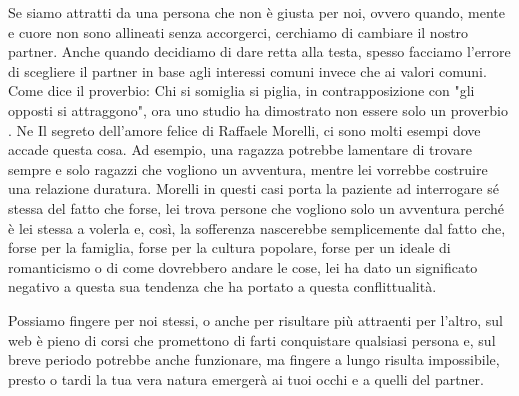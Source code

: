 \documentclass[12pt]{book} %
\begin{document}
Se siamo attratti da una persona che non è giusta per noi, ovvero quando, mente e cuore non sono allineati senza accorgerci, cerchiamo di cambiare il nostro partner. Anche quando decidiamo di dare retta alla testa, spesso facciamo
l'errore di scegliere il partner in base agli interessi comuni invece che ai valori comuni. 
Come dice il proverbio: Chi si somiglia si piglia, in contrapposizione con "gli opposti si attraggono", ora uno studio ha dimostrato non essere solo un proverbio . 
Ne Il segreto dell'amore felice di Raffaele Morelli, ci sono molti esempi dove
accade questa cosa. Ad esempio, una ragazza potrebbe lamentare di trovare sempre e solo ragazzi che vogliono un
avventura, mentre lei vorrebbe costruire una relazione duratura. Morelli in questi casi porta la paziente ad
interrogare sé stessa del fatto che forse, lei trova persone che vogliono solo un avventura perché è lei stessa a
volerla e, così, la sofferenza nascerebbe semplicemente dal fatto che, forse per la famiglia, forse per la cultura
popolare, forse per un ideale di romanticismo o di come dovrebbero andare le cose, lei ha dato un significato negativo a questa sua tendenza che ha portato a questa conflittualità.

Possiamo fingere per noi stessi, o anche per risultare più attraenti per l'altro, sul web è pieno
di corsi che promettono di farti conquistare qualsiasi persona e, sul breve periodo potrebbe anche funzionare, ma
fingere a lungo risulta impossibile, presto o tardi la tua vera natura emergerà ai tuoi occhi e a quelli del partner.


\bigskip
\end{document}
